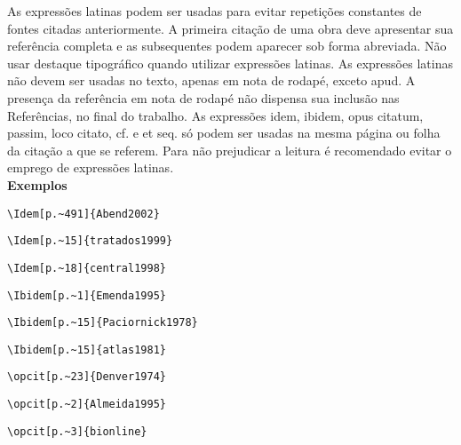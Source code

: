 \begin{alineas}
As express\~oes latinas podem ser usadas para evitar repeti\c{c}\~oes constantes de fontes citadas anteriormente. A primeira cita\c{c}\~ao de uma obra deve apresentar sua refer\^encia completa e as subsequentes podem aparecer sob forma abreviada. N\~ao usar destaque tipogr\'afico quando utilizar express\~oes latinas. As express\~oes latinas n\~ao devem ser usadas no texto, apenas em nota de rodap\'e, exceto apud. A presen\c{c}a da refer\^encia em nota de rodap\'e n\~ao dispensa sua inclus\~ao nas Refer\^encias, no final do trabalho. As express\~oes idem, ibidem, opus citatum, passim, loco citato, cf. e et seq. s\'o podem ser usadas na mesma p\'agina ou folha da cita\c{c}\~ao a que se referem. Para n\~ao prejudicar a leitura \'e recomendado evitar o emprego de express\~oes latinas.\\

\textbf{Exemplos}

\begin{verbatim}
\Idem[p.~491]{Abend2002}
\end{verbatim}

\begin{verbatim}
\Idem[p.~15]{tratados1999}
\end{verbatim}

\begin{verbatim}
\Idem[p.~18]{central1998}
\end{verbatim}

\begin{verbatim}
\Ibidem[p.~1]{Emenda1995}
\end{verbatim}

\begin{verbatim}
\Ibidem[p.~15]{Paciornick1978}
\end{verbatim}

\begin{verbatim}
\Ibidem[p.~15]{atlas1981}
\end{verbatim}

\begin{verbatim}
\opcit[p.~23]{Denver1974}
\end{verbatim}

\begin{verbatim}
\opcit[p.~2]{Almeida1995}
\end{verbatim}

\begin{verbatim}
\opcit[p.~3]{bionline}
\end{verbatim}


\end{alineas}
